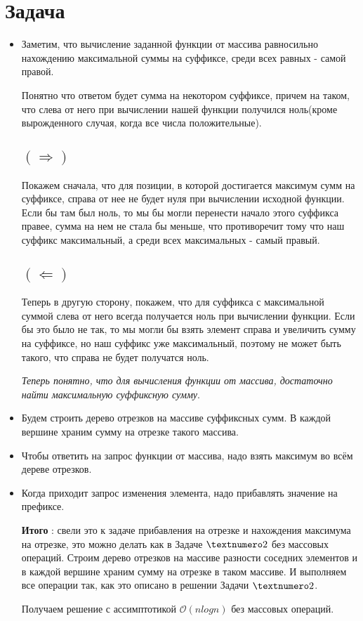 \documentclass{article}
\begin{document}
\section*{Задача }
\begin{itemize}
\item Заметим, что вычисление заданной функции от массива равносильно нахождению максимальной суммы на суффиксе, среди всех равных - самой правой.

Понятно что ответом будет сумма на некотором суффиксе, причем на таком, что слева от него при вычислении нашей функции получился ноль(кроме вырожденного случая, когда все числа положительные).
\subsection*{$(\Rightarrow)$}
Покажем сначала, что для позиции, в которой достигается максимум сумм на суффиксе, справа от нее не будет нуля при вычислении исходной функции. Если бы там был ноль, то мы бы могли перенести начало этого суффикса правее, сумма на нем не стала бы меньше, что противоречит тому что наш суффикс максимальный, а среди всех максимальных - самый правый.
\subsection*{$(\Leftarrow)$}
Теперь в другую сторону, покажем, что для суффикса с максимальной суммой слева от него всегда получается ноль при вычислении функции. Если бы это было не так, то мы могли бы взять элемент справа и увеличить сумму на суффиксе, но наш суффикс уже максимальный, поэтому не может быть такого, что справа не будет получатся ноль.

\textit{Теперь понятно, что для вычисления функции от массива, достаточно найти максимальную суффиксную сумму}.

\item Будем строить дерево отрезков на массиве суффиксных сумм. В каждой вершине храним сумму на отрезке такого массива.
\item Чтобы ответить на запрос функции от массива, надо взять максимум во всём дереве отрезков.
\item Когда приходит запрос изменения элемента, надо прибавлять значение на префиксе. 

\textbf{Итого} : свели это к задаче прибавления на отрезке и нахождения максимума на отрезке, это можно делать как в Задаче $\textnumero 2$ без массовых операций. Строим дерево отрезков на массиве разности соседних элементов и в каждой вершине храним сумму на отрезке в таком массиве. И выполняем все операции так, как это описано в решении Задачи $\textnumero 2$.

Получаем решение с ассимптотикой $\mathcal{O}(nlogn)$ без массовых операций.
\end{itemize}
\end{document}
